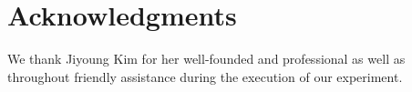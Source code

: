 \section{Acknowledgments}
We thank Jiyoung Kim for her well-founded and professional as well as throughout friendly assistance during the execution of our experiment.
